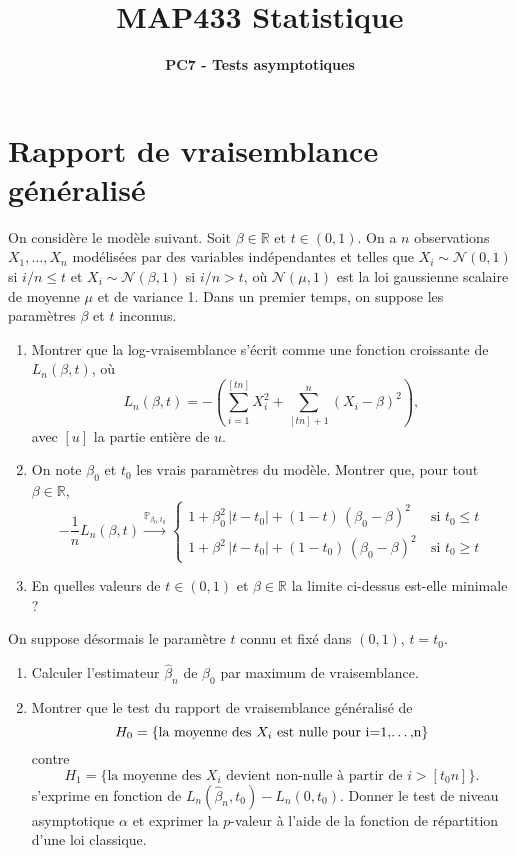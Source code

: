 \documentclass[a4paper,11pt,fleqn]{article}
\title{ {\bf MAP433 Statistique} }
\author{{\bf PC7 - Tests asymptotiques}}
\date{}
\newcommand{\rset}{\ensuremath{\mathbb{R}}}
\newcommand{\1}{\ensuremath{\mathbbm{1}}}
\begin{document}
\maketitle


\section{Rapport de vraisemblance g\'en\'eralis\'e}

On consid\`ere le mod\`ele suivant. Soit $\beta\in\rset$ et $t\in(0,1)$. On a $n$
observations $X_1,\dots,X_n$ mod\'elis\'ees par des variables ind\'ependantes et
telles que $X_i\sim\mathcal{N}(0,1)$ si $i/n\leq t$ et
$X_i\sim\mathcal{N}(\beta,1)$ si $i/n> t$, o\`u $\mathcal{N}(\mu,1)$ est la loi
gaussienne scalaire de moyenne $\mu$ et de variance 1. Dans un premier temps, on suppose les param\`etres $\beta$ et $t$ inconnus.
\begin{enumerate}
\item Montrer que la log-vraisemblance s'\'ecrit  comme une fonction croissante de $L_n(\beta,t)$, o\`u
$$                                                                                                                                                                                                                                                                                                                             
L_{n}(\beta,t)=-\left(\sum_{i=1}^{[tn]}X_i^2+\sum_{[tn]+1}^n(X_i-\beta)^2\right),                                                                                                                                                                                                                                
$$
avec $[u]$ la partie enti\`ere de $u$.
\item On note $\beta_0$ et $t_0$ les vrais param\`etres du mod\`ele. Montrer
  que, pour tout $\beta\in\rset$,
  $$
  -\frac1n L_{n}(\beta,t)\overset{\mathbb{P}_{\beta_0,t_0}}{\longrightarrow}
  \left\{
  \begin{array}{ll}
1+ \beta_0^2\,|t-t_0|+ (1-t)\,(\beta_0-\beta)^2 & \ \text{si $t_0\leq t$} \\
1+ \beta^2\,|t-t_0|+ (1-t_0)\,(\beta_0-\beta)^2 & \ \text{si $t_0 \geq t$} 
  \end{array}
\right.
$$ 
\item En quelles valeurs de $t\in(0,1)$ et $\beta\in\rset$ la limite ci-dessus est-elle minimale ?
\end{enumerate}
 On suppose d\'esormais le param\`etre $t$ connu et  fix\'e dans $(0,1)$, $t=t_0$. 
\begin{enumerate}[resume]
\item Calculer l'estimateur $\hat{\beta}_n$ de
$\beta_0$ par maximum  de vraisemblance.
\item Montrer que le test du rapport de vraisemblance g\'en\'eralis\'e de
$$
H_0=\{\text{la moyenne des $X_i$ est nulle pour i=1,\dots,n}\}
$$
contre
$$
H_1= \{\text{la moyenne des $X_i$ devient non-nulle \`a partir de $i>[t_0 n]$}\}.
$$
s'exprime en fonction de $L_{n}(\hat\beta_n,t_0)-L_{n}(0,t_0)$.  Donner le
test de niveau asymptotique $\alpha$ et exprimer la $p$-valeur à l'aide de la
fonction de répartition d'une loi classique.
\end{enumerate}
\end{document}
